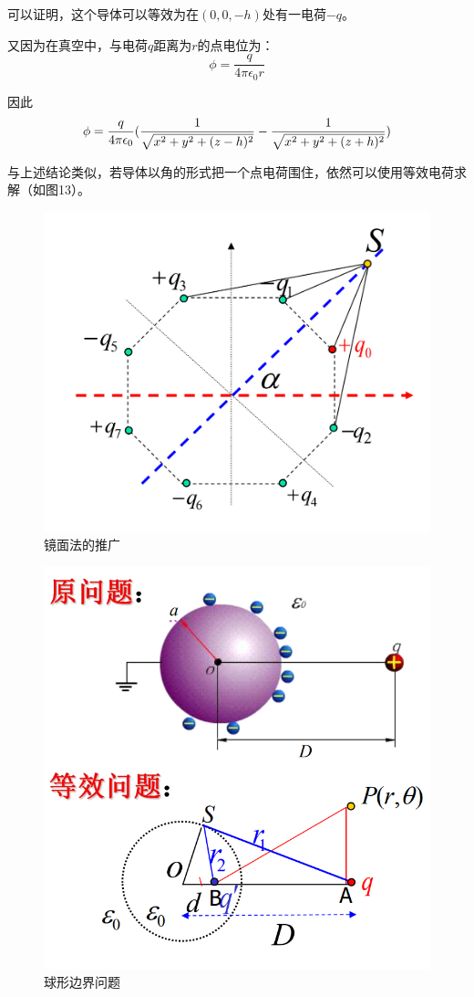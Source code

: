 \documentclass[UTF8,a4paper,11pt]{article}
\begin{document}
可以证明，这个导体可以等效为在$(0,0,-h)$处有一电荷$-q$。

又因为在真空中，与电荷$q$距离为$r$的点电位为：
\begin{equation}
\phi=\frac{q}{4\pi\epsilon_0r}
\end{equation}

因此
\begin{equation}
\phi=\frac{q}{4\pi\epsilon_0}(\frac{1}{\sqrt{x^2+y^2+(z-h)^2}}-\frac{1}{\sqrt{x^2+y^2+(z+h)^2}})
\notag
\end{equation}

与上述结论类似，若导体以角的形式把一个点电荷围住，依然可以使用等效电荷求解（如图13）。
\begin{figure}[htbp]
\centering
\includegraphics[scale=0.3]{p13.png}
\caption{镜面法的推广}
\end{figure}
\begin{figure}[htbp]
\centering
\includegraphics[scale=0.5]{p14.png}
\caption{球形边界问题}
\end{figure}
\end{document}
